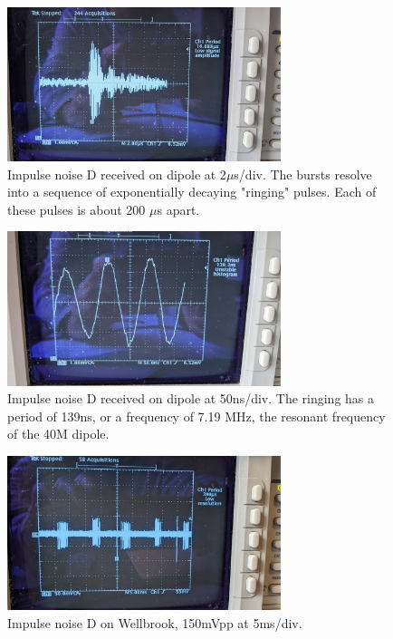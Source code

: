 \documentclass{article}
\begin{document}
\begin{figure}[h]
\caption{Impulse noise D received on dipole at 2$\mu$s/div.  The bursts resolve into a sequence of exponentially decaying "ringing" pulses.  Each of these pulses is about 200 $\mu$s apart.}
\label{fig:D_dipole_2us}
\begin{center}
\includegraphics[width=8cm]{D_dipole_2us.jpg}
\end{center}
\end{figure}

\begin{figure}[h]
\caption{Impulse noise D received on dipole at 50ns/div.  The ringing has a period of 139ns, or a frequency of 7.19 MHz, the resonant frequency of the 40M dipole.}
\label{fig:D_dipole_50ns}
\begin{center}
\includegraphics[width=8cm]{D_dipole_50ns.jpg}
\end{center}
\end{figure}

\begin{figure}[h]
\caption{Impulse noise D on Wellbrook, 150mVpp at 5ms/div.}
\label{fig:D_wellbrook_5ms}
\begin{center}
\includegraphics[width=8cm]{D_wellbrook_5ms.jpg}
\end{center}
\end{figure}
\end{document}
